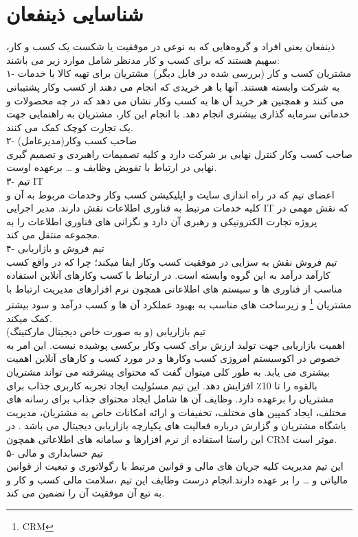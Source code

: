 \documentclass[12pt]{report}
\begin{document}
\section{شناسایی ذینفعان}
ذینفعان یعنی افراد و گروه‌هایی که به نوعی در موفقیت یا شکست یک کسب و کار، سهیم هستند که برای  کسب و کار مدنظر شامل موارد زیر می باشند:\\
۱- مشتریان کسب و کار‌ (بررسی شده در فایل دیگر)\
مشتریان برای تهیه کالا یا خدمات به شرکت وابسته هستند. آنها با هر خریدی که انجام می دهند از کسب وکار پشتیبانی می کنند و همچنین هر خرید آن ها به کسب وکار نشان می دهد که در چه محصولات و خدماتی سرمایه گذاری بیشتری انجام دهد. با انجام این کار، مشتریان به راهنمایی جهت یک تجارت کوچک کمک می کنند.\\
۲- صاحب کسب وکار(مدیرعامل)\\
صاحب کسب وکار کنترل نهایی بر شرکت دارد و کلیه تصمیمات راهبردی و تصمیم گیری نهایی در ارتباط با تفویض وظایف و … برعهده اوست.\\
۳- تیم IT \\
اعضای تیم که در راه اندازی سایت و اپلیکیشن کسب وکار وخدمات مربوط به آن و کلیه خدمات مرتبط به فناوری اطلاعات نقش دارند.
مدیر اجرایی IT  که نقش مهمی در پروژه تجارت الکترونیکی و رهبری آن دارد و نگرانی های فناوری اطلاعات را به مجموعه منتقل می کند. \\
۴- تیم فروش و بازاریابی\\
تیم فروش نقش به سزایی در موفقیت کسب وکار ایفا میکند؛ چرا که در واقع کسب کارآمد درآمد به این گروه وابسته است. در ارتباط با کسب وکارهای آنلاین استفاده مناسب از فناوری ها و سیستم های اطلاعاتی همچون نرم افزارهای مدیریت ارتباط با مشتریان \footnote{\label{myfootnote}CRM} و زیرساخت های مناسب به بهبود عملکرد آن ها و کسب درآمد و سود بیشتر کمک میکند.\\
تیم بازاریابی (و به صورت خاص دیجیتال مارکتینگ)\\
اهمیت بازاریابی جهت تولید ارزش برای کسب وکار برکسی پوشیده نیست. این امر به خصوص در اکوسیستم امروزی کسب وکارها و در مورد کسب و کارهای آنلاین اهمیت بیشتری می یابد. به طور کلی میتوان گفت که محتوای پیشرفته می تواند مشتریان بالقوه را تا 10٪ افزایش دهد.
این تیم مسئولیت ایجاد تجربه کاربری جذاب برای مشتریان را برعهده دارد. وظایف آن ها شامل ایجاد محتوای جذاب برای رسانه های مختلف، ایجاد کمپین های مختلف، تخفیفات و ارائه امکانات خاص به مشتریان، مدیریت باشگاه مشتریان و گزارش درباره فعالیت های یکپارچه بازاریابی دیجیتال می باشد . در این راستا استفاده از نرم افزارها و سامانه های اطلاعاتی همچون CRM موثر است.\\
۵- تیم حسابداری و مالی \\
این تیم مدیریت کلیه جریان های مالی و قوانین مرتبط با رگولاتوری و تبعیت از قوانین مالیاتی و … را بر عهده دارند.انجام درست وظایف این تیم ،‌سلامت مالی کسب و کار و به تبع آن موفقیت آن را تضمین می کند.\\
\end{document}
